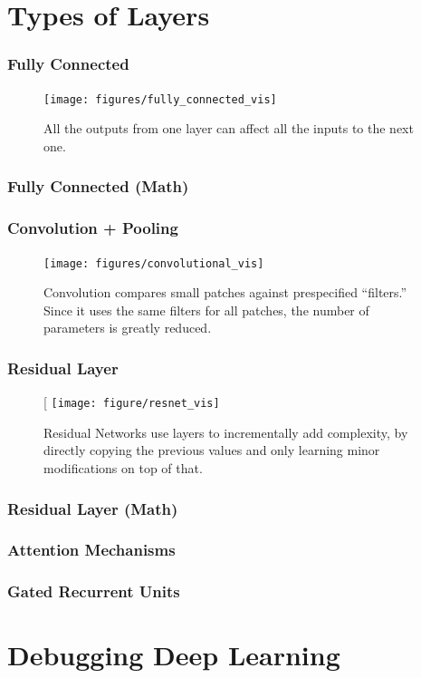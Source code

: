 \documentclass[10pt,mathserif]{beamer}
\begin{document}
\section{Types of Layers}

\begin{frame}
  \frametitle{Fully Connected}
\begin{figure}
  \centering
  \texttt{[image: figures/fully\_connected\_vis]}
  \caption{All the outputs from one layer can affect all the inputs to the next
    one. \label{fig:fully_connected}}
\end{figure}
\end{frame}

\begin{frame}
  \frametitle{Fully Connected (Math)}
\end{frame}

\begin{frame}
  \frametitle{Convolution + Pooling}
  \begin{figure}
    \centering
    \texttt{[image: figures/convolutional\_vis]}
    \caption{Convolution compares small patches against prespecified
      ``filters.'' Since it uses the same filters for all patches, the number of
      parameters is greatly reduced.
       \label{fig:convolutional_vis}}
  \end{figure}
\end{frame}

\begin{frame}
  \frametitle{Residual Layer}
  \begin{figure}[
      \centering
      \texttt{[image: figure/resnet\_vis]}
      \caption{Residual Networks use layers to incrementally 
        add complexity, by directly copying the previous values and only
        learning minor modifications on top of that. \label{fig:resnet_vis} }
  \end{figure}
\end{frame}

\begin{frame}
  \frametitle{Residual Layer (Math)}
\end{frame}

\begin{frame}
  \frametitle{Attention Mechanisms}
\end{frame}

\begin{frame}
  \frametitle{Gated Recurrent Units}
\end{frame}

\section{Debugging Deep Learning}
\end{document}
